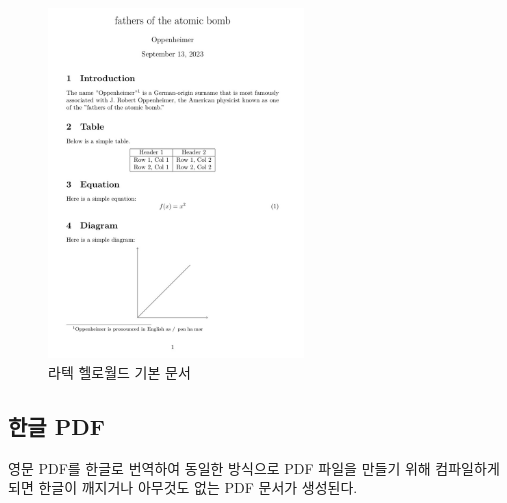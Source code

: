 \documentclass[
  letterpaper,
]{book}
\begin{document}
\begin{figure}

{\centering \includegraphics[width=2.66667in,height=\textheight]{images/pdf_english.jpg}

}

\caption{라텍 헬로월드 기본 문서}

\end{figure}

\hypertarget{uxd55cuxae00-pdf}{%
\subsection{한글 PDF}\label{uxd55cuxae00-pdf}}

영문 PDF를 한글로 번역하여 동일한 방식으로 PDF 파일을 만들기 위해
컴파일하게 되면 한글이 깨지거나 아무것도 없는 PDF 문서가 생성된다.
\end{document}
